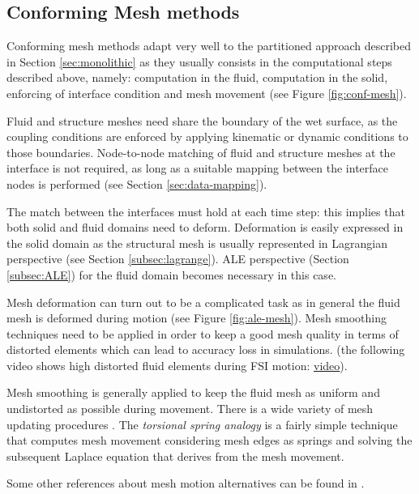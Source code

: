 \subsection{Conforming Mesh methods}
\label{sec:conforming-mesh}

Conforming mesh methods adapt very well to the partitioned approach described in Section \ref{sec:monolithic} as they usually consists in the computational steps described above, namely: computation in the fluid, computation in the solid, enforcing of interface condition and mesh movement (see Figure \ref{fig:conf-mesh}).   

Fluid and structure meshes need share the boundary of the wet surface, as the coupling conditions are enforced by applying kinematic or dynamic conditions to those boundaries.
Node-to-node matching of fluid and structure meshes at the interface is not required, as long as a suitable mapping between the interface nodes is performed (see Section \ref{sec:data-mapping}).

The match between the interfaces must hold at each time step: this implies that both solid and fluid domains need to deform. Deformation is easily expressed in the solid domain as the structural mesh is usually represented in Lagrangian perspective (see Section \ref{subsec:lagrange}). ALE perspective (Section \ref{subsec:ALE}) for the fluid domain becomes necessary in this case.

Mesh deformation can turn out to be a complicated task as in general the fluid mesh is deformed during motion (see Figure \ref{fig:ale-mesh}). Mesh smoothing techniques need to be applied in order to keep a good mesh quality in terms of distorted elements which can lead to accuracy loss in simulations. (the following video shows high distorted fluid elements during FSI motion: \href{https://youtu.be/zJ7PR90Y2TI}{video}). 

Mesh smoothing is generally applied to keep the fluid mesh as uniform and undistorted as possible during movement.
There is a wide variety of mesh updating procedures \cite{van2007comparison}.
The \textit{torsional spring analogy} \cite{degand2002three} is a fairly simple technique that computes mesh movement considering mesh edges as springs and solving the subsequent Laplace equation that derives from the mesh movement. 

Some other references about mesh motion alternatives can be found in \cite{gonzalez2009mesh}.


